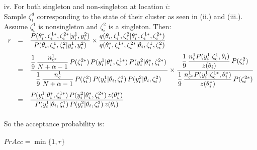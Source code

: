 \documentclass[10pt]{article}
\begin{document}
\begin{enumerate}
\begin{itemize}
\item[iv.] For both singleton and non-singleton at location $i$: \\
Sample $\zeta_i^d$ corresponding to the state of their cluster as seen in (ii.) and (iii.). Assume $\zeta_i^1$ is nonsingleton and $\zeta_i^2$ is a singleton. Then: \\

$\begin{array}{rcl}
r & = & \dfrac{
P(\theta_i^*, \zeta_i^{1*}, \zeta_i^{2*}|y_i^1, y_i^2)
}{ 
P(\theta_i, \zeta_i^{1}, \zeta_i^{2}|y_i^1, y_i^2)
} \times \dfrac{
q(\theta_i, \zeta_i^1, \zeta_i^2|\theta_i^*, \zeta_i^{1*}, \zeta_i^{2*})
}{
q(\theta_i^*, \zeta_i^{1*}, \zeta_i^{2*}|\theta_i, \zeta_i^1, \zeta_i^2)
}\\
\noalign{\medskip}

&=& \dfrac{
	\dfrac{1}{9}\, \dfrac{n_{c^*}^1}{N+\alpha-1}\, P(\zeta_i^{2*})\, P(y_i^1|\theta_i^*, \zeta_i^{1*})\, P(y_i^2|\theta_i^*, \zeta_i^{2*})\,
}{
\dfrac{1}{9}\, \dfrac{n_{c}^1}{N+\alpha-1}\, P(\zeta_i^{2})\, P(y_i^1|\theta_i, \zeta_i^{1})\, P(y_i^2|\theta_i, \zeta_i^{2})\,
} \times 

\dfrac{
\dfrac{1}{9}\,  \dfrac{n_{c}^1 P(y_i^1|\zeta_{c}^1, \theta_i)}{z(\theta_i)}\, P(\zeta_i^2) 
}{
\dfrac{1}{9}\, \dfrac{n_{c^*}^1 P(y_i^1|\zeta_{c}^{1*}, \theta_i^*)}{z(\theta_i^*)}\, P(\zeta_i^{2*})
}\\
\noalign{\medskip}
&=& \dfrac{
	P(y_i^1|\theta_i^*, \zeta_i^{1*})\, P(y_i^2|\theta_i^*, \zeta_i^{2*})\, z(\theta_i^*)
	}{
	P(y_i^1|\theta_i, \zeta_i^{1})\, P(y_i^2|\theta_i, \zeta_i^{2})\, z(\theta_i)
	}
\end{array}$\\
\\
So the acceptance probability is: \\
\\
$PrAcc = \min\{1, r\}$
\end{itemize}  
\end{enumerate}
\end{document}
